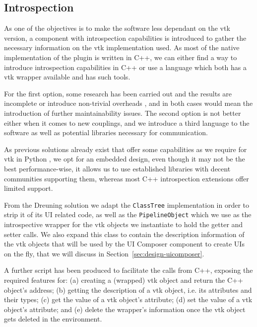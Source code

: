 \subsection{Introspection}
\label{sec:design-introspection}

As one of the objectives is to make the software less dependant on the \acrshort{vtk} version, a component with introspection capabilities is introduced to gather the necessary information on the \acrshort{vtk} implementation used. As most of the native implementation of the plugin is written in C++, we can either find a way to introduce introspection capabilities in C++ or use a language which both has a \acrshort{vtk} wrapper available and has such tools.

For the first option, some research has been carried out and the results are incomplete \cite{tyng1998nonintrusive} or introduce non-trivial overheads \cite{bayser2012rtti}, and in both cases would mean the introduction of further maintainability issues. The second option is not better either when it comes to new couplings, and we introduce a third language to the software as well as potential libraries necessary for communication.

As previous solutions already exist that offer some capabilities as we require for \acrshort{vtk} in Python \cite{dreuning_visual_2016}, we opt for an embedded design, even though it may not be the best performance-wise, it allows us to use established libraries with decent communities supporting them, whereas most C++ introspection extensions offer limited support.

From the Dreuning solution we adapt the \verb|ClassTree| implementation in order to strip it of its UI related code, as well as the \verb|PipelineObject| which we use as the introspective wrapper for the \acrshort{vtk} objects we instantiate to hold the getter and setter calls. We also expand this class to contain the description information of the \acrshort{vtk} objects that will be used by the UI Composer component to create UIs on the fly, that we will discuss in Section~\ref{sec:design-uicomposer}.

A further script has been produced to facilitate the calls from C++, exposing the required features for: (a) creating a (wrapped) \acrshort{vtk} object and return the C++ object's address; (b) getting the description of a \acrshort{vtk} object, i.e. its attributes and their types; (c) get the value of a \acrshort{vtk} object's attribute; (d) set the value of a \acrshort{vtk} object's attribute; and (e) delete the wrapper's information once the \acrshort{vtk} object gets deleted in the environment. 

